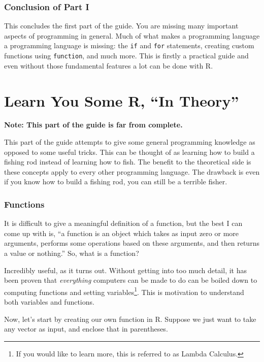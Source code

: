 \documentclass[12pt]{article}
\theoremstyle{remark}
\begin{document}

\section{Conclusion of Part I}
This concludes the first part of the guide. You are missing many important aspects of programming in general. Much of what makes a programming language a programming language is missing: the \verb|if| and \verb|for| statements, creating custom functions using \verb|function|, and much more. This is firstly a practical guide and even without those fundamental features a lot can be done with R.

\clearpage
\part{Learn You Some R, ``In Theory''}
\textbf{Note: This part of the guide is far from complete.}

This part of the guide attempts to give some general programming knowledge as opposed to some useful tricks. This can be thought of as learning how to build a fishing rod instead of learning how to fish. The benefit to the theoretical side is these concepts apply to every other programming language. The drawback is even if you know how to build a fishing rod, you can still be a terrible fisher.

\section{Functions}\label{functions}
It is difficult to give a meaningful definition of a function, but the best I can come up with is, ``a function is an object which takes as input zero or more arguments, performs some operations based on these arguments, and then returns a value or nothing.'' So, what is a function?

Incredibly useful, as it turns out. Without getting into too much detail, it has been proven that \emph{everything} computers can be made to do can be boiled down to computing functions and setting variables\footnote{If you would like to learn more, this is referred to as Lambda Calculus.}. This is motivation to understand both variables and functions.

Now, let's start by creating our own function in R. Suppose we just want to take any vector as input, and enclose that in parentheses.
\end{document}
